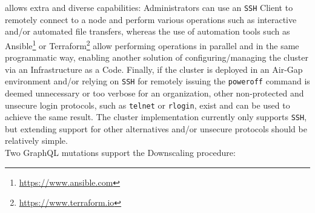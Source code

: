 allows extra and diverse capabilities: Administrators can use an \texttt{SSH}
Client to remotely connect to a node and perform various operations such as
interactive and/or automated file transfers, whereas the use of automation tools
such as Ansible\footnote{\url{https://www.ansible.com}} or Terraform\footnote{\url{https://www.terraform.io}}
allow performing operations in parallel and in the same programmatic way,
enabling another solution of configuring/managing the cluster via an
Infrastructure as a Code. Finally, if the cluster is deployed in an Air-Gap
environment and/or relying on \texttt{SSH} for remotely issuing the \texttt{poweroff}
command is deemed unnecessary or too verbose for an organization, other non-protected
and unsecure login protocols, such as \texttt{telnet} or \texttt{rlogin}, exist and
can be used to achieve the same result. The cluster implementation currently
only supports \texttt{SSH}, but extending support for other alternatives and/or
unsecure protocols should be relatively simple. \\ %
Two GraphQL mutations support the Downscaling procedure:
